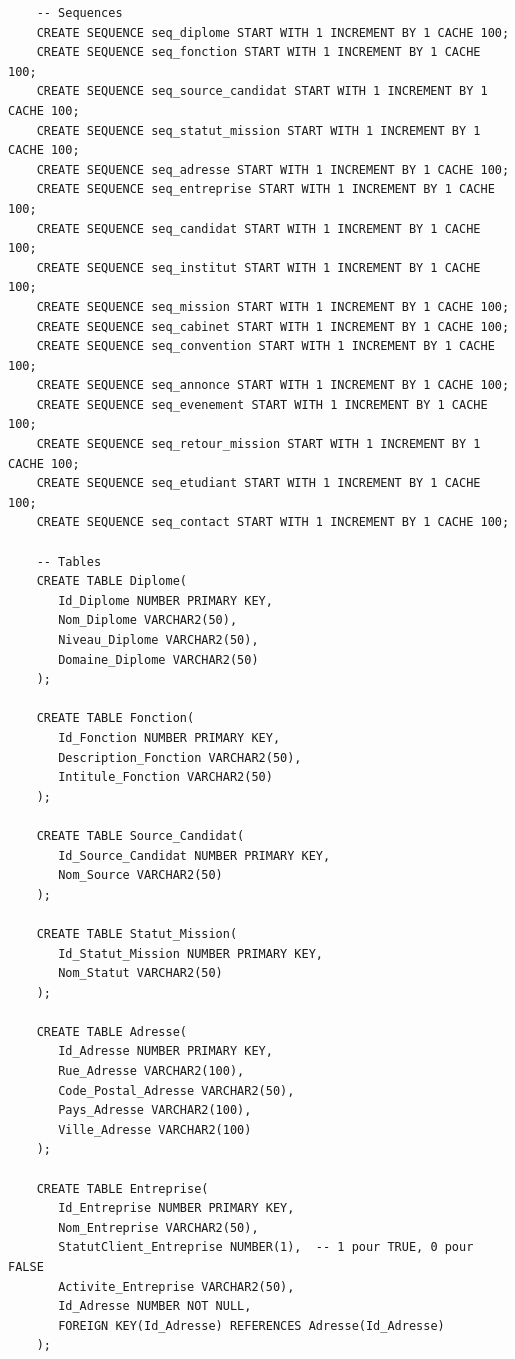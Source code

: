 \documentclass[a4paper,12pt]{article}
\begin{document}
\begin{verbatim}
    -- Sequences
    CREATE SEQUENCE seq_diplome START WITH 1 INCREMENT BY 1 CACHE 100;
    CREATE SEQUENCE seq_fonction START WITH 1 INCREMENT BY 1 CACHE 100;
    CREATE SEQUENCE seq_source_candidat START WITH 1 INCREMENT BY 1 CACHE 100;
    CREATE SEQUENCE seq_statut_mission START WITH 1 INCREMENT BY 1 CACHE 100;
    CREATE SEQUENCE seq_adresse START WITH 1 INCREMENT BY 1 CACHE 100;
    CREATE SEQUENCE seq_entreprise START WITH 1 INCREMENT BY 1 CACHE 100;
    CREATE SEQUENCE seq_candidat START WITH 1 INCREMENT BY 1 CACHE 100;
    CREATE SEQUENCE seq_institut START WITH 1 INCREMENT BY 1 CACHE 100; 
    CREATE SEQUENCE seq_mission START WITH 1 INCREMENT BY 1 CACHE 100;
    CREATE SEQUENCE seq_cabinet START WITH 1 INCREMENT BY 1 CACHE 100;
    CREATE SEQUENCE seq_convention START WITH 1 INCREMENT BY 1 CACHE 100;
    CREATE SEQUENCE seq_annonce START WITH 1 INCREMENT BY 1 CACHE 100;
    CREATE SEQUENCE seq_evenement START WITH 1 INCREMENT BY 1 CACHE 100;
    CREATE SEQUENCE seq_retour_mission START WITH 1 INCREMENT BY 1 CACHE 100;
    CREATE SEQUENCE seq_etudiant START WITH 1 INCREMENT BY 1 CACHE 100;
    CREATE SEQUENCE seq_contact START WITH 1 INCREMENT BY 1 CACHE 100; 
    
    -- Tables
    CREATE TABLE Diplome(
       Id_Diplome NUMBER PRIMARY KEY,
       Nom_Diplome VARCHAR2(50),
       Niveau_Diplome VARCHAR2(50),
       Domaine_Diplome VARCHAR2(50)
    );
    
    CREATE TABLE Fonction(
       Id_Fonction NUMBER PRIMARY KEY,
       Description_Fonction VARCHAR2(50),
       Intitule_Fonction VARCHAR2(50)
    );
    
    CREATE TABLE Source_Candidat(
       Id_Source_Candidat NUMBER PRIMARY KEY,
       Nom_Source VARCHAR2(50)
    );
    
    CREATE TABLE Statut_Mission(
       Id_Statut_Mission NUMBER PRIMARY KEY,
       Nom_Statut VARCHAR2(50)
    );
    
    CREATE TABLE Adresse(
       Id_Adresse NUMBER PRIMARY KEY,
       Rue_Adresse VARCHAR2(100),
       Code_Postal_Adresse VARCHAR2(50),
       Pays_Adresse VARCHAR2(100),
       Ville_Adresse VARCHAR2(100)
    );
    
    CREATE TABLE Entreprise(
       Id_Entreprise NUMBER PRIMARY KEY,
       Nom_Entreprise VARCHAR2(50),
       StatutClient_Entreprise NUMBER(1),  -- 1 pour TRUE, 0 pour FALSE
       Activite_Entreprise VARCHAR2(50),
       Id_Adresse NUMBER NOT NULL,
       FOREIGN KEY(Id_Adresse) REFERENCES Adresse(Id_Adresse)
    );
    

\end{verbatim}
\end{document}
